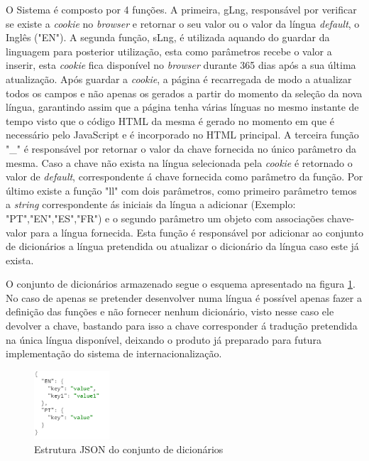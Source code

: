 \par O Sistema é composto por 4 funções. A primeira, gLng, responsável por verificar se existe a \textit{cookie} no \textit{browser} e retornar o seu valor ou o valor da língua \textit{default}, o Inglês ("EN"). A segunda função, sLng, é utilizada aquando do guardar da linguagem para posterior utilização, esta como parâmetros recebe o valor a inserir, esta \textit{cookie} fica disponível no \textit{browser} durante 365 dias após a sua última atualização. Após guardar a \textit{cookie}, a página é recarregada de modo a atualizar todos os campos e não apenas os gerados a partir do momento da seleção da nova língua, garantindo assim que a página tenha várias línguas no mesmo instante de tempo visto que o código HTML da mesma é gerado no momento em que é necessário pelo JavaScript e é incorporado no HTML principal. A terceira função "\_" é responsável por retornar o valor da chave fornecida no único parâmetro da mesma. Caso a chave não exista na língua selecionada pela \textit{cookie} é retornado o valor de \textit{default}, correspondente á chave fornecida como parâmetro da função. Por último existe a função "ll" com dois parâmetros, como primeiro parâmetro temos a \textit{string} correspondente ás iniciais da língua a adicionar (Exemplo: "PT","EN","ES","FR") e o segundo parâmetro um objeto com associações chave-valor para a língua fornecida. Esta função é responsável por adicionar ao conjunto de dicionários a língua pretendida ou atualizar o dicionário da língua caso este já exista.
\par O conjunto de dicionários armazenado segue o esquema apresentado na figura \ref{dicextr}. No caso de apenas se pretender desenvolver numa língua é possível apenas fazer a definição das funções e não fornecer nenhum dicionário, visto nesse caso ele devolver a chave, bastando para isso a chave corresponder á tradução pretendida na única língua disponível, deixando o produto já preparado para futura implementação do sistema de internacionalização.



\begin{figure}[ht]
\centering
\includegraphics[width=0.25\textwidth]{images/extrjson.png}
\caption{Estrutura JSON do conjunto de dicionários}\label{dicextr}
\end{figure}


